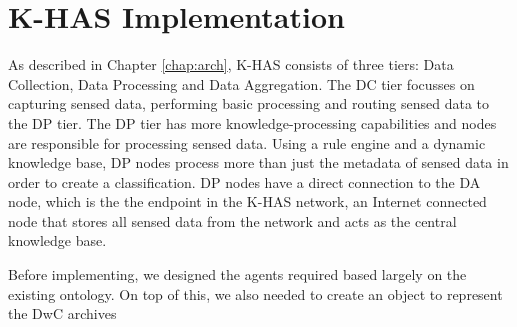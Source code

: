 \section{K-HAS Implementation}
As described in Chapter \ref{chap:arch}, K-HAS consists of three tiers: Data Collection, Data Processing and Data Aggregation. The DC tier focusses on capturing sensed data, performing basic processing and routing sensed data to the DP tier. The DP tier has more knowledge-processing capabilities and nodes are responsible for processing sensed data. Using a rule engine and a dynamic knowledge base, DP nodes process more than just the metadata of sensed data in order to create a classification. DP nodes have a direct connection to the DA node, which is the the endpoint in the K-HAS network, an Internet connected node that stores all sensed data from the network and acts as the central knowledge base.



Before implementing, we designed the agents required based largely on the existing ontology. On top of this, we also needed to create an object to represent the DwC archives 